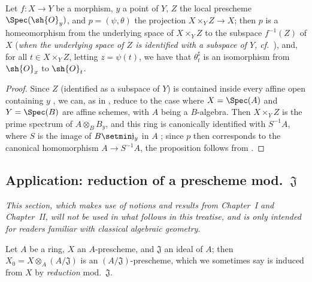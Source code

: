 \begin{proposition}[3.6.5]
\label{I.3.6.5}
Let $f:X\to Y$ be a morphism, $y$ a point of $Y$, $Z$ the local prescheme $\Spec(\sh{O}_y)$, and $p=(\psi,\theta)$ the projection $X\times_Y Z\to X$; then $p$ is a homeomorphism from the underlying space of $X\times_Y Z$ to the subspace $f^{-1}(Z)$ of $X$ (\emph{when the underlying space of $Z$ is identified with a subspace of $Y$, cf.~}), and, for all $t\in X\times_Y Z$, letting $z=\psi(t)$, we have that $\theta_t^\sharp$ is an isomorphism from $\sh{O}_x$ to $\sh{O}_t$.
\end{proposition}

\begin{proof}
Since $Z$ (identified as a subspace of $Y$) is contained inside every affine open containing $y$ , we can, as in , reduce to the case where $X=\Spec(A)$ and $Y=\Spec(B)$ are affine schemes, with $A$ being a $B$-algebra.
Then $X\times_Y Z$ is the prime spectrum of $A\otimes_B B_y$, and this ring is canonically identified with $S^{-1}A$, where $S$ is the image of $B\setmin\mathfrak{j}_y$ in $A$ ; since $p$ then corresponds to the canonical homomorphism $A\to S^{-1}A$, the proposition follows from .
\end{proof}

\subsection{Application: reduction of a prescheme mod.~$\mathfrak{J}$}
\label{subsection:I.3.7}

\emph{This section, which makes use of notions and results from Chapter~I and Chapter~II, will not be used in what follows in this treatise, and is only intended for readers familiar with classical algebraic geometry}.

\begin{env}[3.7.1]
\label{I.3.7.1}
Let $A$ be a ring, $X$ an $A$-prescheme, and $\mathfrak{J}$ an ideal of $A$; then $X_0=X\otimes_A(A/\mathfrak{J})$ is an $(A/\mathfrak{J})$-prescheme, which we sometimes say is induced from $X$ by \emph{reduction} mod.~$\mathfrak{J}$.
\end{env}

